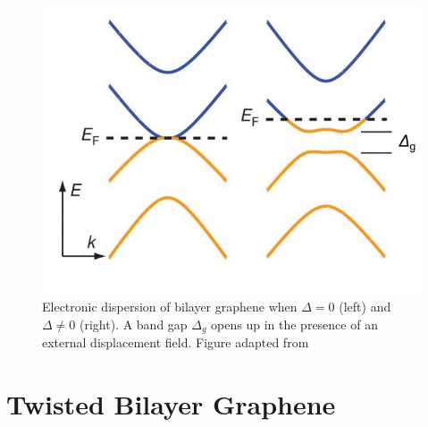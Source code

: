      \begin{figure}[H]
         \centering
         \includegraphics[width=\textwidth]{figures/bilayer_dispersion.jpg}
         \caption{Electronic dispersion of bilayer graphene when $\Delta=0$ (left) and $\Delta\neq0$ (right). A band gap $\Delta_g$ opens up in the presence of an external displacement field. Figure adapted from \cite{Zhang2009}}
         \label{fig:bilayer_dispersion}
     \end{figure}

\section{Twisted Bilayer Graphene}
